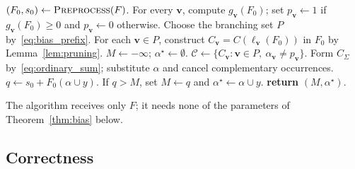 \documentclass[11pt,a4paper]{article}
\theoremstyle{definition}
\theoremstyle{remark}
\begin{document}
\begin{algorithm}[tp]
\caption{\textnormal{\textsc{LiteralGap}}$(F)$}
\label{alg:literal_gap}\label{alg:bias}
\begin{algorithmic}[1]
\STATE $(F_0,s_0)\gets\textnormal{\textsc{Preprocess}}(F)$.
\STATE For every $\mathbf v$, compute $g_{\mathbf v}(F_0)$; set $p_{\mathbf v}\gets1$ if $g_{\mathbf v}(F_0)\ge0$ and $p_{\mathbf v}\gets0$ otherwise.
\STATE Choose the branching set $P$ by~\eqref{eq:bias_prefix}.
\STATE For each $\mathbf v\in P$, construct $C_{\mathbf v}=C(\ell_{\mathbf v}(F_0))$ in $F_0$ by Lemma~\ref{lem:pruning}.
\STATE $M\gets-\infty$; $\alpha^\star\gets\emptyset$.
  \STATE $\mathcal C\gets\{C_{\mathbf v}:\mathbf v\in P,\ \alpha_{\mathbf v}\ne p_{\mathbf v}\}$.
  \STATE Form $C_\Sigma$ by~\eqref{eq:ordinary_sum}; substitute $\alpha$ and cancel complementary occurrences.
      \STATE $q\gets s_0+F_0(\alpha\cup y)$.
      \STATE If $q>M$, set $M\gets q$ and $\alpha^\star\gets\alpha\cup y$.
    \ENDFOR
  \ENDIF
\ENDFOR
\STATE \textbf{return} $(M,\alpha^\star)$.
\end{algorithmic}
\end{algorithm}

The algorithm receives only $F$; it needs none of the parameters of
Theorem~\ref{thm:bias} below.

\subsection{Correctness}
\end{document}
